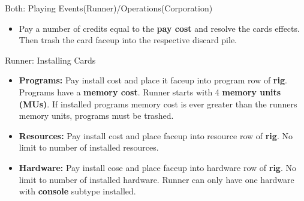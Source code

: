 \documentclass[12pt]{article}
\begin{document}
\begin{multicols*}{2}
Both: Playing Events(Runner)/Operations(Corporation)
\begin{itemize}
	\item Pay a number of credits equal to the \textbf{pay cost} and resolve the cards effects. Then trash the card faceup into the respective discard pile.
\end{itemize}

Runner: Installing Cards
\begin{itemize}
	\item \textbf{Programs:} Pay install cost and place it faceup into program row of \textbf{rig}. Programs have a \textbf{memory cost}. Runner starts with 4 \textbf{memory units (MUs)}. If installed programs memory cost is ever greater than the runners memory units, programs must be trashed.
	\item \textbf{Resources:} Pay install cost and place faceup into resource row of \textbf{rig}. No limit to number of installed resources.
	\item \textbf{Hardware:} Pay install cose and place faceup into hardware row of \textbf{rig}. No limit to number of installed hardware. Runner can only have one hardware with \textbf{console} subtype installed.
\end{itemize}
\end{multicols*}
\end{document}
